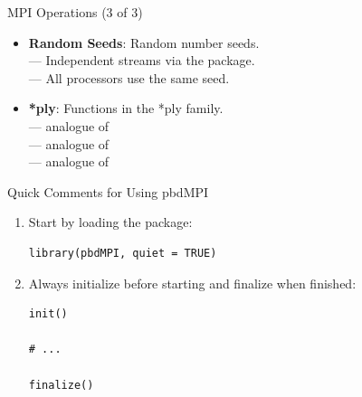 \begin{frame}
  \begin{block}{MPI Operations (3 of 3)}\pause
    \begin{itemize}
      \item \textbf{Random Seeds}:  Random number seeds.\\
       --- Independent streams via the  package.\\
       --- All processors use the same seed.\\[.4cm]
      \item \textbf{*ply}:  Functions in the *ply family.\\
       --- analogue of \\
       --- analogue of \\
       --- analogue of \\
    \end{itemize}
  \end{block}
\end{frame}


\begin{frame}[fragile]
  \begin{block}{Quick Comments for Using pbdMPI}\pause
    \begin{enumerate}
      \item Start by loading the package:
\vspace{-.4cm}
\begin{lstlisting}
library(pbdMPI, quiet = TRUE)
\end{lstlisting}
      \item Always initialize before starting and finalize when finished:
\vspace{-.4cm}
\begin{lstlisting}
init()

# ...

finalize()
\end{lstlisting}
\end{enumerate}
\end{block}
\end{frame}